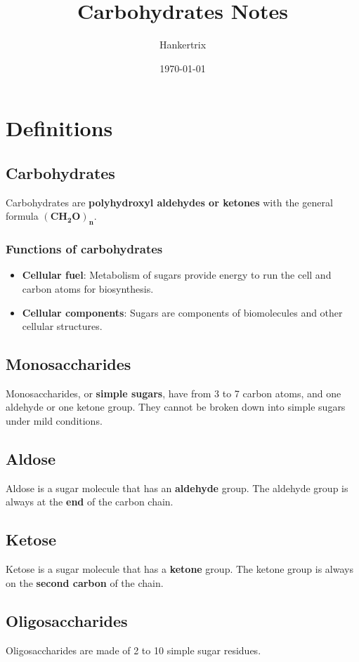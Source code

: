 \documentclass[11pt]{article}
\author{Hankertrix}
\date{\today}
\title{Carbohydrates Notes}
\begin{document}
\maketitle
\setcounter{tocdepth}{2}
\tableofcontents \clearpage\section{Definitions}
\label{sec:org9381fac}

\subsection{Carbohydrates}
\label{sec:org3a1001f}
Carbohydrates are \textbf{polyhydroxyl aldehydes or ketones} with the general formula \(\boldsymbol{(CH_2O)_n}\).
\subsubsection{Functions of carbohydrates}
\label{sec:org0587d91}
\begin{itemize}
\item \textbf{Cellular fuel}: Metabolism of sugars provide energy to run the cell and carbon atoms for biosynthesis.
\item \textbf{Cellular components}: Sugars are components of biomolecules and other cellular structures.
\end{itemize}
\subsection{Monosaccharides}
\label{sec:org0b9532b}
Monosaccharides, or \textbf{simple sugars}, have from 3 to 7 carbon atoms, and one aldehyde or one ketone group. They cannot be broken down into simple sugars under mild conditions.
\subsection{Aldose}
\label{sec:org6a2330d}
Aldose is a sugar molecule that has an \textbf{aldehyde} group. The aldehyde group is always at the \textbf{end} of the carbon chain.
\subsection{Ketose}
\label{sec:org47a7fc0}
Ketose is a sugar molecule that has a \textbf{ketone} group. The ketone group is always on the \textbf{second carbon} of the chain.
\subsection{Oligosaccharides}
\label{sec:org09a3ebd}
Oligosaccharides are made of 2 to 10 simple sugar residues.
\end{document}
